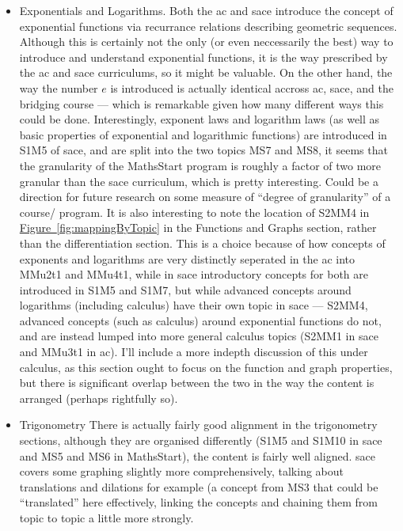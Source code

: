 \documentclass[twoside,12pt,a4paper]{report}
\newcommand{\reffig}[1]{\hyperref[fig:#1]{Figure~\ref{fig:#1}}}
\begin{document}
\begin{itemize}
\begin{itemize}
			\item Exponentials and Logarithms. Both the \gls{ac} and \gls{sace} introduce the concept of exponential functions via recurrance relations describing geometric sequences. Although this is certainly not the only (or even neccessarily the best) way to introduce and understand exponential functions, it is the way prescribed by the \gls{ac} and \gls{sace} curriculums, so it might be valuable.  On the other hand, the way the number $e$ is introduced is actually identical accross \gls{ac}, \gls{sace}, and the bridging course --- which is remarkable given how many different ways this could be done. Interestingly, exponent laws and logarithm laws (as well as basic properties of exponential and logarithmic functions) are introduced in S1M5 of \gls{sace}, and are split into the two topics MS7 and MS8, it seems that the granularity of the MathsStart program is roughly a factor of two more granular than the \gls{sace} curriculum, which is pretty interesting. Could be a direction for future research on some measure of ``degree of granularity'' of a course/ program. It is also interesting to note the location of S2MM4 in \reffig{mappingByTopic} in the Functions and Graphs section, rather than the differentiation section. This is a choice because of how concepts of exponents and logarithms are very distinctly seperated in the \gls{ac} into MMu2t1 and MMu4t1, while in \gls{sace} introductory concepts for both are introduced in S1M5 and S1M7, but while advanced concepts around logarithms (including calculus) have their own topic in \gls{sace} --- S2MM4, advanced concepts (such as calculus) around exponential functions do not, and are instead lumped into more general calculus topics (S2MM1 in \gls{sace} and MMu3t1 in \gls{ac}). I'll include a more indepth discussion of this under calculus, as this section ought to focus on the function and graph properties, but there is significant overlap between the two in the way the content is arranged (perhaps rightfully so).
			\item Trigonometry There is actually fairly good alignment in the trigonometry sections, although they are organised differently (S1M5 and S1M10 in \gls{sace} and MS5 and MS6 in MathsStart), the content is fairly well aligned. \gls{sace} covers some graphing slightly more comprehensively, talking about translations and dilations for example (a concept from MS3 that could be ``translated'' here effectively, linking the concepts and chaining them from topic to topic a little more strongly. 
		\end{itemize}

\end{itemize}
\end{document}
